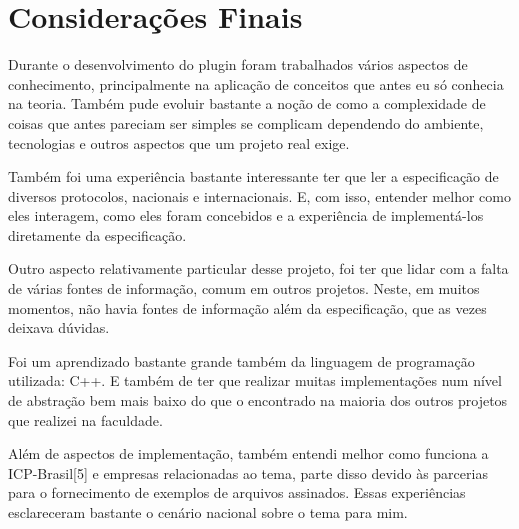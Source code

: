 \chapter[Considerações Finais]{Considerações Finais}

Durante o desenvolvimento do plugin foram trabalhados vários aspectos de conhecimento, principalmente na aplicação 
de conceitos que antes eu só conhecia na teoria. Também pude evoluir bastante a noção de como a complexidade de coisas
que antes pareciam ser simples se complicam dependendo do ambiente, tecnologias e outros aspectos 
que um projeto real exige.

Também foi uma experiência bastante interessante ter que ler a especificação de diversos protocolos, nacionais e internacionais. E, com
isso, entender melhor como eles interagem, como eles foram concebidos e a experiência de implementá-los diretamente da especificação.

Outro aspecto relativamente particular desse projeto, foi ter que lidar com a falta de várias fontes de informação, comum em outros
projetos. Neste, em muitos momentos, não havia fontes de informação além da especificação, que as vezes deixava dúvidas.

Foi um aprendizado bastante grande também da linguagem de programação utilizada: C++. E também de ter que realizar muitas implementações
num nível de abstração bem mais baixo do que o encontrado na maioria dos outros projetos que realizei na faculdade.

Além de aspectos de implementação, também entendi melhor como funciona a ICP-Brasil[5] e empresas relacionadas ao tema, parte disso devido
às parcerias para o fornecimento de exemplos de arquivos assinados. Essas experiências esclareceram bastante o cenário nacional sobre o tema para mim.

